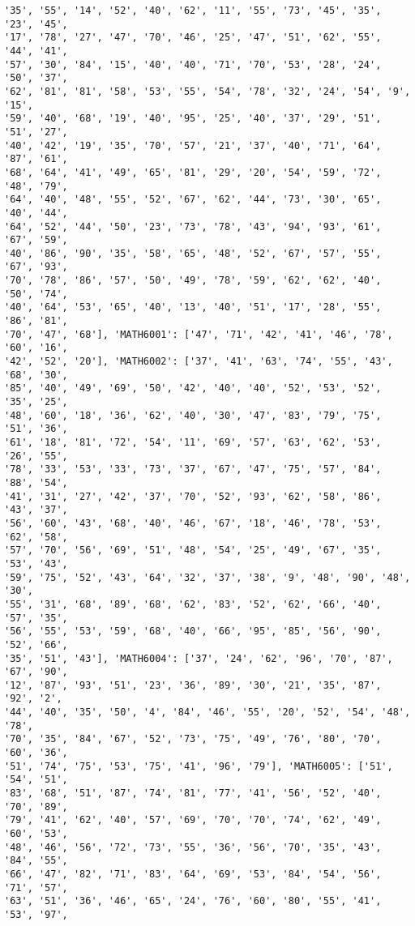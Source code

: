 \documentclass[11pt]{article}
\begin{document}
\begin{Verbatim}[commandchars=\\\{\}]
'35', '55', '14', '52', '40', '62', '11', '55', '73', '45', '35', '23', '45',
'17', '78', '27', '47', '70', '46', '25', '47', '51', '62', '55', '44', '41',
'57', '30', '84', '15', '40', '40', '71', '70', '53', '28', '24', '50', '37',
'62', '81', '81', '58', '53', '55', '54', '78', '32', '24', '54', '9', '15',
'59', '40', '68', '19', '40', '95', '25', '40', '37', '29', '51', '51', '27',
'40', '42', '19', '35', '70', '57', '21', '37', '40', '71', '64', '87', '61',
'68', '64', '41', '49', '65', '81', '29', '20', '54', '59', '72', '48', '79',
'64', '40', '48', '55', '52', '67', '62', '44', '73', '30', '65', '40', '44',
'64', '52', '44', '50', '23', '73', '78', '43', '94', '93', '61', '67', '59',
'40', '86', '90', '35', '58', '65', '48', '52', '67', '57', '55', '67', '93',
'70', '78', '86', '57', '50', '49', '78', '59', '62', '62', '40', '50', '74',
'40', '64', '53', '65', '40', '13', '40', '51', '17', '28', '55', '86', '81',
'70', '47', '68'], 'MATH6001': ['47', '71', '42', '41', '46', '78', '60', '16',
'42', '52', '20'], 'MATH6002': ['37', '41', '63', '74', '55', '43', '68', '30',
'85', '40', '49', '69', '50', '42', '40', '40', '52', '53', '52', '35', '25',
'48', '60', '18', '36', '62', '40', '30', '47', '83', '79', '75', '51', '36',
'61', '18', '81', '72', '54', '11', '69', '57', '63', '62', '53', '26', '55',
'78', '33', '53', '33', '73', '37', '67', '47', '75', '57', '84', '88', '54',
'41', '31', '27', '42', '37', '70', '52', '93', '62', '58', '86', '43', '37',
'56', '60', '43', '68', '40', '46', '67', '18', '46', '78', '53', '62', '58',
'57', '70', '56', '69', '51', '48', '54', '25', '49', '67', '35', '53', '43',
'59', '75', '52', '43', '64', '32', '37', '38', '9', '48', '90', '48', '30',
'55', '31', '68', '89', '68', '62', '83', '52', '62', '66', '40', '57', '35',
'56', '55', '53', '59', '68', '40', '66', '95', '85', '56', '90', '52', '66',
'35', '51', '43'], 'MATH6004': ['37', '24', '62', '96', '70', '87', '67', '90',
'12', '87', '93', '51', '23', '36', '89', '30', '21', '35', '87', '92', '2',
'44', '40', '35', '50', '4', '84', '46', '55', '20', '52', '54', '48', '78',
'70', '35', '84', '67', '52', '73', '75', '49', '76', '80', '70', '60', '36',
'51', '74', '75', '53', '75', '41', '96', '79'], 'MATH6005': ['51', '54', '51',
'83', '68', '51', '87', '74', '81', '77', '41', '56', '52', '40', '70', '89',
'79', '41', '62', '40', '57', '69', '70', '70', '74', '62', '49', '60', '53',
'48', '46', '56', '72', '73', '55', '36', '56', '70', '35', '43', '84', '55',
'66', '47', '82', '71', '83', '64', '69', '53', '84', '54', '56', '71', '57',
'63', '51', '36', '46', '65', '24', '76', '60', '80', '55', '41', '53', '97',

\end{Verbatim}
\end{document}
